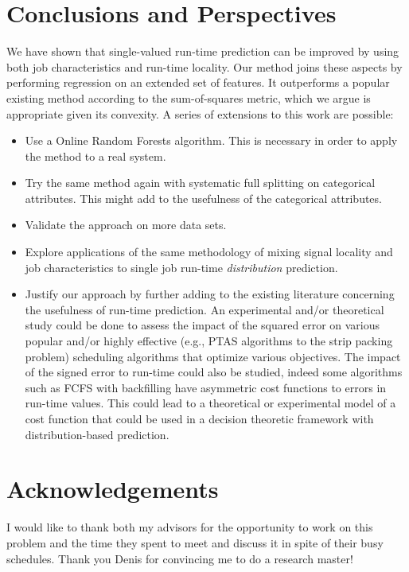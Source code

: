 \documentclass{article}
\begin{document}

    \section{Conclusions and Perspectives}
    \label{sec:conclusions}
    We have shown that single-valued run-time prediction can be improved by using both job characteristics and run-time locality. Our method joins these aspects by performing regression on an extended set of features. It outperforms a popular existing method according to the sum-of-squares metric, which we argue is appropriate given its convexity.
    A series of extensions to this work are possible:
    \begin{itemize}
      \item Use a Online Random Forests algorithm. This is necessary in order to apply the method to a real system.
      \item Try the same method again with systematic full splitting on categorical attributes. This might add to the usefulness of the categorical attributes.
      \item Validate the approach on more data sets.
      \item Explore applications of the same methodology of mixing signal locality and job characteristics to single job run-time \textit{distribution} prediction.
      \item Justify our approach by further adding to the existing literature concerning the usefulness of run-time prediction. An experimental and/or theoretical study could be done to assess the impact of the squared error on various popular and/or highly effective (e.g., PTAS algorithms to the strip packing problem) scheduling algorithms that optimize various objectives. The impact of the signed error to run-time could also be studied, indeed some algorithms such as FCFS with backfilling have asymmetric cost functions to errors in run-time values. This could lead to a theoretical or experimental model of a cost function that could be used in a decision theoretic framework with distribution-based prediction.
    \end{itemize}

    \section{Acknowledgements}
    \label{sec:conclusions}
    I would like to thank both my advisors for the opportunity to work on this problem and the time they spent to meet and discuss it in spite of their busy schedules. Thank you Denis for convincing me to do a research master!


    
    

    
\end{document}
